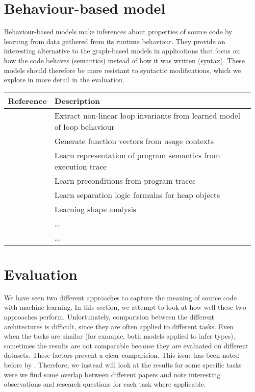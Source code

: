 \documentclass[sigconf,authordraft=true,nonacm=true]{acmart}
\begin{document}
\section{Behaviour-based model}
Behaviour-based models make inferences about properties of source code by learning from data gathered from its runtime behaviour.
They provide an interesting alternative to the graph-based models in applications that focus on how the code behaves (semantics) instead of how it was written (syntax).
These models should therefore be more resistant to syntactic modifications, which we explore in more detail in the evaluation.

\begin{table*}[t]
  \begin{tabularx}{\textwidth}{lX}
    \toprule
    Reference & Description \\
    \midrule
    \citet{yao_learning_2020} & Extract non-linear loop invariants from learned model of loop behaviour \\
    \citet{henkel_code_2018} & Generate function vectors from usage contexts \\
    \citet{wang_learning_2019} & Learn representation of program semantics from execution trace \\
    \citet{padhi_data-driven_2016} & Learn preconditions from program traces \\
    \citet{li_gated_2017} & Learn separation logic formulas for heap objects \\
    \citet{brockschmidt_learning_2017} & Learning shape analysis \\
    \citet{piech_learning_2015} & ... \\
    \citet{paasen_execution_2016} & ... \\
    \bottomrule
  \end{tabularx}
\end{table*}

\section{Evaluation}\label{sec:eval}

We have seen two different approaches to capture the meaning of source code with machine learning.
In this section, we attempt to look at how well these two approaches perform.
Unfortunately, comparision between the different architectures is difficult, since they are often applied to different tasks.
Even when the tasks are similar (for example, both models applied to infer types), sometimes the results are not comparable because they are evaluated on different datasets.
These factors prevent a clear comparision.
This issue has been noted before by \citet[p. 71]{bourgeois_learning_2019}.
Therefore, we instead will look at the results for some specific tasks were we find some overlap between different papers and note interesting observations and research questions for each task where applicable.
\end{document}
